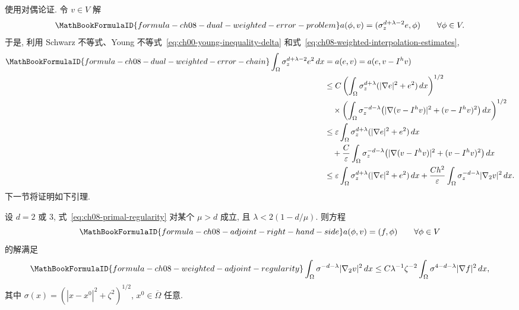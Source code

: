 \begin{Proof}
使用对偶论证. 令 $v\in V$ 解
\begin{equation}
\MathBookFormulaID{formula-ch08-dual-weighted-error-problem}
\label{eq:ch08-dual-weighted-error-problem}
a(\phi,v)=(\sigma_z^{d+\lambda-2}e,\phi)
\qquad\forall\phi\in V.
\end{equation}
于是, 利用 Schwarz 不等式、Young 不等式~\eqref{eq:ch00-young-inequality-delta} 和式~\eqref{eq:ch08-weighted-interpolation-estimates},
\begin{align*}
\MathBookFormulaID{formula-ch08-dual-weighted-error-chain}
\int_\Omega\sigma_z^{d+\lambda-2}e^2\,dx
&=a(e,v)=a(e,v-I^hv)\\
&\leq C\left(\int_\Omega\sigma_z^{d+\lambda}(|\nabla e|^2+e^2)\,dx\right)^{1/2}\\
&\quad\times\left(\int_\Omega\sigma_z^{-d-\lambda}
\bigl(|\nabla(v-I^hv)|^2+(v-I^hv)^2\bigr)\,dx\right)^{1/2}\\
&\leq\varepsilon\int_\Omega\sigma_z^{d+\lambda}(|\nabla e|^2+e^2)\,dx\\
&\quad+\frac{C}{\varepsilon}\int_\Omega\sigma_z^{-d-\lambda}
\bigl(|\nabla(v-I^hv)|^2+(v-I^hv)^2\bigr)\,dx\\
&\leq\varepsilon\int_\Omega\sigma_z^{d+\lambda}(|\nabla e|^2+e^2)\,dx
+\frac{Ch^2}{\varepsilon}\int_\Omega\sigma_z^{-d-\lambda}|\nabla_2v|^2\,dx.
\end{align*}
下一节将证明如下引理.

\begin{Lemma}
\label{lem:ch08-weighted-adjoint-regularity}
设 $d=2$ 或 $3$, 式~\eqref{eq:ch08-primal-regularity} 对某个 $\mu>d$ 成立, 且 $\lambda<2(1-d/\mu)$. 则方程
\[
\MathBookFormulaID{formula-ch08-adjoint-right-hand-side}
a(\phi,v)=(f,\phi)
\qquad\forall\phi\in V
\]
的解满足
\[
\MathBookFormulaID{formula-ch08-weighted-adjoint-regularity}
\int_\Omega\sigma^{-d-\lambda}|\nabla_2v|^2\,dx
\leq C\lambda^{-1}\zeta^{-2}
\int_\Omega\sigma^{4-d-\lambda}|\nabla f|^2\,dx,
\]
其中 $\sigma(x)=(|x-x^0|^2+\zeta^2)^{1/2}$, $x^0\in\overline\Omega$ 任意.
\end{Lemma}


\end{Proof}
